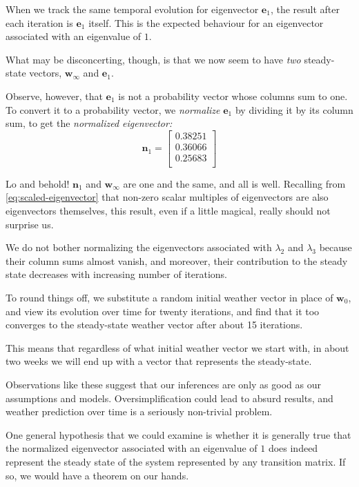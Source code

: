 \documentclass[
  11pt,
  british,
  a4paper,
]{article}
\begin{document}
When we track the same temporal evolution for eigenvector
\(\symbf{e}_{1}\), the result after each iteration is \(\symbf{e}_{1}\)
itself. This is the expected behaviour for an eigenvector associated
with an eigenvalue of \(1\).

What may be disconcerting, though, is that we now seem to have
\emph{two} steady-state vectors, \(\symbf{w}_{\infty}\) and
\(\symbf{e}_{1}\).

Observe, however, that \(\symbf{e}_{1}\) is not a probability vector
whose columns sum to one. To convert it to a probability vector, we
\emph{normalize} \(\symbf{e}_{1}\) by dividing it by its column sum, to
get the \emph{normalized eigenvector:} \begin{equation}
\symbf{n}_{1} = \begin{bmatrix}
0.38251\\
0.36066\\
0.25683\\
\end{bmatrix}
\label{eq:normalized-eigenvector-1}\end{equation}

Lo and behold! \(\symbf{n}_{1}\) and \(\symbf{w}_{\infty}\) are one and
the same, and all is well. Recalling from \cref{eq:scaled-eigenvector}
that non-zero scalar multiples of eigenvectors are also eigenvectors
themselves, this result, even if a little magical, really should not
surprise us.

We do not bother normalizing the eigenvectors associated with
\(\lambda_{2}\) and \(\lambda_{3}\) because their column sums almost
vanish, and moreover, their contribution to the steady state decreases
with increasing number of iterations.

To round things off, we substitute a random initial weather vector in
place of \(\symbf{w}_{0}\), and view its evolution over time for twenty
iterations, and find that it too converges to the steady-state weather
vector after about 15 iterations.

This means that regardless of what initial weather vector we start with,
in about two weeks we will end up with a vector that represents the
steady-state.

Observations like these suggest that our inferences are only as good as
our assumptions and models. Oversimplification could lead to absurd
results, and weather prediction over time is a seriously non-trivial
problem.

One general hypothesis that we could examine is whether it is generally
true that the normalized eigenvector associated with an eigenvalue of
\(1\) does indeed represent the steady state of the system represented
by any transition matrix. If so, we would have a theorem on our hands.
\end{document}
